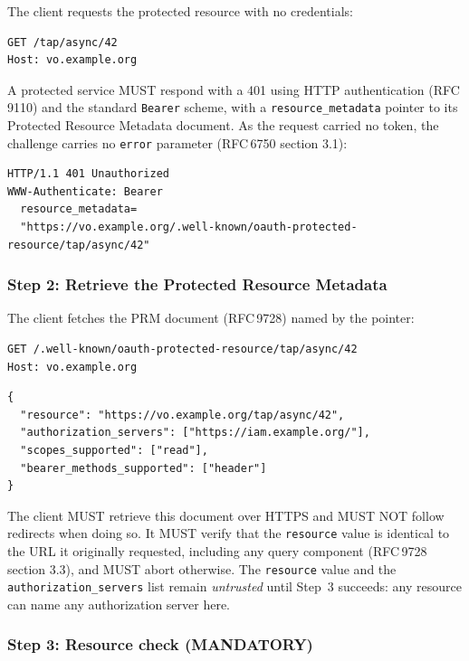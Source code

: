 \documentclass[11pt,a4paper]{ivoa}
\newcommand{\rfc}[1]{RFC\,#1}
\begin{document}
The client requests the protected resource with no credentials:

\begin{verbatim}
GET /tap/async/42
Host: vo.example.org
\end{verbatim}

A protected service MUST respond with a 401 using HTTP authentication
(\rfc{9110}) and the standard \verb|Bearer| scheme, with a \verb|resource_metadata|
pointer to its Protected Resource Metadata document. As the request carried no token,
the challenge carries no \verb|error| parameter (\rfc{6750} section 3.1):

{\footnotesize
\begin{verbatim}
HTTP/1.1 401 Unauthorized
WWW-Authenticate: Bearer
  resource_metadata=
  "https://vo.example.org/.well-known/oauth-protected-resource/tap/async/42"
\end{verbatim}
}

\subsubsection{Step 2: Retrieve the Protected Resource Metadata}

The client fetches the PRM document (\rfc{9728}) named by the pointer:

\begin{verbatim}
GET /.well-known/oauth-protected-resource/tap/async/42
Host: vo.example.org
\end{verbatim}

\begin{verbatim}
{
  "resource": "https://vo.example.org/tap/async/42",
  "authorization_servers": ["https://iam.example.org/"],
  "scopes_supported": ["read"],
  "bearer_methods_supported": ["header"]
}
\end{verbatim}

The client MUST retrieve this document over HTTPS and MUST NOT follow
redirects when doing so. It MUST verify that the \verb|resource| value is
identical to the URL it originally requested, including any query component
(\rfc{9728} section 3.3), and MUST abort otherwise. The \verb|resource| value and the
\verb|authorization_servers| list remain \emph{untrusted} until Step~3 succeeds:
any resource can name any authorization server here.

\subsubsection{Step 3: Resource check (MANDATORY)}
\end{document}
